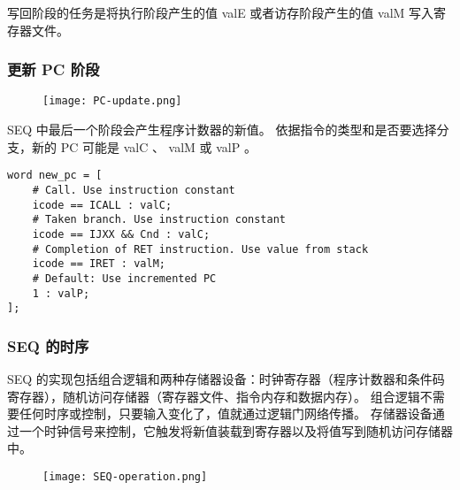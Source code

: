 写回阶段的任务是将执行阶段产生的值 valE 或者访存阶段产生的值 valM 写入寄存器文件。

\subsubsection{更新 PC 阶段}
\begin{figure}[H]
    \centering
    \texttt{[image: PC-update.png]}
\end{figure}

SEQ 中最后一个阶段会产生程序计数器的新值。
依据指令的类型和是否要选择分支，新的 PC 可能是 valC 、 valM 或 valP 。
\begin{lstlisting}[style=CStyle]
word new_pc = [
    # Call. Use instruction constant
    icode == ICALL : valC;
    # Taken branch. Use instruction constant
    icode == IJXX && Cnd : valC;
    # Completion of RET instruction. Use value from stack
    icode == IRET : valM;
    # Default: Use incremented PC
    1 : valP;
];
\end{lstlisting}

\subsubsection{SEQ 的时序}

SEQ 的实现包括组合逻辑和两种存储器设备：时钟寄存器（程序计数器和条件码寄存器），随机访问存储器（寄存器文件、指令内存和数据内存）。
组合逻辑不需要任何时序或控制，只要输入变化了，值就通过逻辑门网络传播。
存储器设备通过一个时钟信号来控制，它触发将新值装载到寄存器以及将值写到随机访问存储器中。

\begin{figure}[H]
    \centering
    \texttt{[image: SEQ-operation.png]}
\end{figure}















\newpage